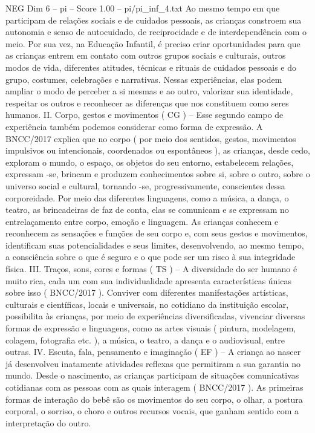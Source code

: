 \begin{textsample}{NEG Dim 6 – pi – Score 1.00 – pi/pi\_inf\_4.txt}
Ao mesmo tempo em que participam de relações sociais e de cuidados pessoais, as crianças constroem sua autonomia e senso de autocuidado, de reciprocidade e de interdependência com o meio.
Por sua vez, na Educação Infantil, é preciso criar oportunidades para que as crianças entrem em contato com outros grupos sociais e culturais, outros modos de vida, diferentes atitudes, técnicas e rituais de cuidados pessoais e do grupo, costumes, celebrações e narrativas.
Nessas experiências, elas podem ampliar o modo de perceber a si mesmas e ao outro, valorizar sua identidade, respeitar os outros e reconhecer as diferenças que nos constituem como seres humanos.
II.
Corpo, gestos e movimentos ( CG ) – Esse segundo campo de experiência também podemos considerar como forma de expressão.
A BNCC/2017 explica que no corpo ( por meio dos sentidos, gestos, movimentos impulsivos ou intencionais, coordenados ou espontâneos ), as crianças, desde cedo, exploram o mundo, o espaço, os objetos do seu entorno, estabelecem relações, expressam -se, brincam e produzem conhecimentos sobre si, sobre o outro, sobre o universo social e cultural, tornando -se, progressivamente, conscientes dessa corporeidade.
Por meio das diferentes linguagens, como a música, a dança, o teatro, as brincadeiras de faz de conta, elas se comunicam e se expressam no entrelaçamento entre corpo, emoção e linguagem.
As crianças conhecem e reconhecem as sensações e funções de seu corpo e, com seus gestos e movimentos, identificam suas potencialidades e seus limites, desenvolvendo, ao mesmo tempo, a consciência sobre o que é seguro e o que pode ser um risco à sua integridade física.
III.
Traços, sons, cores e formas ( TS ) – A diversidade do ser humano é muito rica, cada um com sua individualidade apresenta características únicas sobre isso ( BNCC/2017 ).
Conviver com diferentes manifestações artísticas, culturais e científicas, locais e universais, no cotidiano da instituição escolar, possibilita às crianças, por meio de experiências diversificadas, vivenciar diversas formas de expressão e linguagens, como as artes visuais ( pintura, modelagem, colagem, fotografia etc. ), a música, o teatro, a dança e o audiovisual, entre outras.
IV.
Escuta, fala, pensamento e imaginação ( EF ) – A criança ao nascer já desenvolveu inatamente atividades reflexas que permitiram a sua garantia no mundo.
Desde o nascimento, as crianças participam de situações comunicativas cotidianas com as pessoas com as quais interagem ( BNCC/2017 ).
As primeiras formas de interação do bebê são os movimentos do seu corpo, o olhar, a postura corporal, o sorriso, o choro e outros recursos vocais, que ganham sentido com a interpretação do outro.

\end{textsample}
